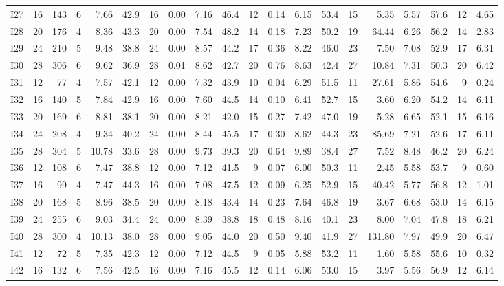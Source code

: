 \begin{landscape}
\begin{table}[p]
{\begin{tabular}{lrrr*{4}{rrrr}}
I27 & 16 & 143 & 6 & 7.66 & 42.9 & 16 & 0.00 & 7.16 & 46.4 & 12 & 0.14 & 6.15 & 53.4 & 15 & 5.35 & 5.57 & 57.6 & 12 & 4.65 \\
I28 & 20 & 176 & 4 & 8.36 & 43.3 & 20 & 0.00 & 7.54 & 48.2 & 14 & 0.18 & 7.23 & 50.2 & 19 & 64.44 & 6.26 & 56.2 & 14 & 2.83 \\
I29 & 24 & 210 & 5 & 9.48 & 38.8 & 24 & 0.00 & 8.57 & 44.2 & 17 & 0.36 & 8.22 & 46.0 & 23 & 7.50 & 7.08 & 52.9 & 17 & 6.31 \\
I30 & 28 & 306 & 6 & 9.62 & 36.9 & 28 & 0.01 & 8.62 & 42.7 & 20 & 0.76 & 8.63 & 42.4 & 27 & 10.84 & 7.31 & 50.3 & 20 & 6.42 \\
I31 & 12 & 77 & 4 & 7.57 & 42.1 & 12 & 0.00 & 7.32 & 43.9 & 10 & 0.04 & 6.29 & 51.5 & 11 & 27.61 & 5.86 & 54.6 & 9 & 0.24 \\
I32 & 16 & 140 & 5 & 7.84 & 42.9 & 16 & 0.00 & 7.60 & 44.5 & 14 & 0.10 & 6.41 & 52.7 & 15 & 3.60 & 6.20 & 54.2 & 14 & 6.11 \\
I33 & 20 & 169 & 6 & 8.81 & 38.1 & 20 & 0.00 & 8.21 & 42.0 & 15 & 0.27 & 7.42 & 47.0 & 19 & 5.28 & 6.65 & 52.1 & 15 & 6.16 \\
I34 & 24 & 208 & 4 & 9.34 & 40.2 & 24 & 0.00 & 8.44 & 45.5 & 17 & 0.30 & 8.62 & 44.3 & 23 & 85.69 & 7.21 & 52.6 & 17 & 6.11 \\
I35 & 28 & 304 & 5 & 10.78 & 33.6 & 28 & 0.00 & 9.73 & 39.3 & 20 & 0.64 & 9.89 & 38.4 & 27 & 7.52 & 8.48 & 46.2 & 20 & 6.24 \\
I36 & 12 & 108 & 6 & 7.47 & 38.8 & 12 & 0.00 & 7.12 & 41.5 & 9 & 0.07 & 6.00 & 50.3 & 11 & 2.45 & 5.58 & 53.7 & 9 & 0.60 \\
I37 & 16 & 99 & 4 & 7.47 & 44.3 & 16 & 0.00 & 7.08 & 47.5 & 12 & 0.09 & 6.25 & 52.9 & 15 & 40.42 & 5.77 & 56.8 & 12 & 1.01 \\
I38 & 20 & 168 & 5 & 8.96 & 38.5 & 20 & 0.00 & 8.18 & 43.4 & 14 & 0.23 & 7.64 & 46.8 & 19 & 3.67 & 6.68 & 53.0 & 14 & 6.15 \\
I39 & 24 & 255 & 6 & 9.03 & 34.4 & 24 & 0.00 & 8.39 & 38.8 & 18 & 0.48 & 8.16 & 40.1 & 23 & 8.00 & 7.04 & 47.8 & 18 & 6.21 \\
I40 & 28 & 300 & 4 & 10.13 & 38.0 & 28 & 0.00 & 9.05 & 44.0 & 20 & 0.50 & 9.40 & 41.9 & 27 & 131.80 & 7.97 & 49.9 & 20 & 6.47 \\
I41 & 12 & 72 & 5 & 7.35 & 42.3 & 12 & 0.00 & 7.12 & 44.5 & 9 & 0.05 & 5.88 & 53.2 & 11 & 1.60 & 5.58 & 55.6 & 10 & 0.32 \\
I42 & 16 & 132 & 6 & 7.56 & 42.5 & 16 & 0.00 & 7.16 & 45.5 & 12 & 0.14 & 6.06 & 53.0 & 15 & 3.97 & 5.56 & 56.9 & 12 & 6.14 \\

\end{tabular}}
\end{table}
\end{landscape}
